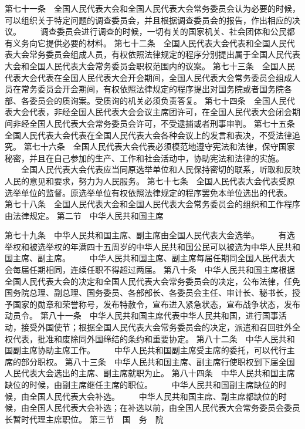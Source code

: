      第七十一条　全国人民代表大会和全国人民代表大会常务委员会认为必要的时候，可以组织关于特定问题的调查委员会，并且根据调查委员会的报告，作出相应的决议。
　　调查委员会进行调查的时候，一切有关的国家机关、社会团体和公民都有义务向它提供必要的材料。
     第七十二条　全国人民代表大会代表和全国人民代表大会常务委员会组成人员，有权依照法律规定的程序分别提出属于全国人民代表大会和全国人民代表大会常务委员会职权范围内的议案。
     第七十三条　全国人民代表大会代表在全国人民代表大会开会期间，全国人民代表大会常务委员会组成人员在常务委员会开会期间，有权依照法律规定的程序提出对国务院或者国务院各部、各委员会的质询案。受质询的机关必须负责答复。
     第七十四条　全国人民代表大会代表，非经全国人民代表大会会议主席团许可，在全国人民代表大会闭会期间非经全国人民代表大会常务委员会许可，不受逮捕或者刑事审判。
     第七十五条　全国人民代表大会代表在全国人民代表大会各种会议上的发言和表决，不受法律追究。
     第七十六条　全国人民代表大会代表必须模范地遵守宪法和法律，保守国家秘密，并且在自己参加的生产、工作和社会活动中，协助宪法和法律的实施。
 　　全国人民代表大会代表应当同原选举单位和人民保持密切的联系，听取和反映人民的意见和要求，努力为人民服务。
     第七十七条　全国人民代表大会代表受原选举单位的监督。原选举单位有权依照法律规定的程序罢免本单位选出的代表。
     第七十八条　全国人民代表大会和全国人民代表大会常务委员会的组织和工作程序由法律规定。
第二节　中华人民共和国主席

     第七十九条　中华人民共和国主席、副主席由全国人民代表大会选举。
　　有选举权和被选举权的年满四十五周岁的中华人民共和国公民可以被选为中华人民共和国主席、副主席。
　　中华人民共和国主席、副主席每届任期同全国人民代表大会每届任期相同，连续任职不得超过两届。
     第八十条　中华人民共和国主席根据全国人民代表大会的决定和全国人民代表大会常务委员会的决定，公布法律，任免国务院总理、副总理、国务委员、各部部长、各委员会主任、审计长、秘书长，授予国家的勋章和荣誉称号，发布特赦令，宣布进入紧急状态，宣布战争状态，发布动员令。
     第八十一条　中华人民共和国主席代表中华人民共和国，进行国事活动，接受外国使节；根据全国人民代表大会常务委员会的决定，派遣和召回驻外全权代表，批准和废除同外国缔结的条约和重要协定。
     第八十二条　中华人民共和国副主席协助主席工作。
　　中华人民共和国副主席受主席的委托，可以代行主席的部分职权。
     第八十三条　中华人民共和国主席、副主席行使职权到下届全国人民代表大会选出的主席、副主席就职为止。
     第八十四条　中华人民共和国主席缺位的时候，由副主席继任主席的职位。
　　中华人民共和国副主席缺位的时候，由全国人民代表大会补选。
 　　中华人民共和国主席、副主席都缺位的时候，由全国人民代表大会补选；在补选以前，由全国人民代表大会常务委员会委员长暂时代理主席职位。
第三节　国　务　院

